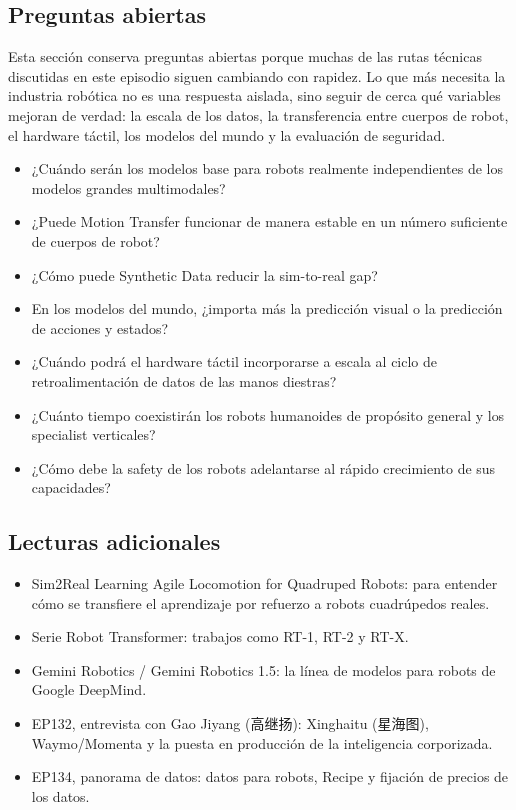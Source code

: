 \documentclass[a4paper]{article}
\begin{document}
\subsection{Preguntas abiertas}

Esta sección conserva preguntas abiertas porque muchas de las rutas técnicas discutidas en este episodio siguen cambiando con rapidez. Lo que más necesita la industria robótica no es una respuesta aislada, sino seguir de cerca qué variables mejoran de verdad: la escala de los datos, la transferencia entre cuerpos de robot, el hardware táctil, los modelos del mundo y la evaluación de seguridad.

\begin{itemize}
\item ¿Cuándo serán los modelos base para robots realmente independientes de los modelos grandes multimodales?
\item ¿Puede Motion Transfer funcionar de manera estable en un número suficiente de cuerpos de robot?
\item ¿Cómo puede Synthetic Data reducir la sim-to-real gap?
\item En los modelos del mundo, ¿importa más la predicción visual o la predicción de acciones y estados?
\item ¿Cuándo podrá el hardware táctil incorporarse a escala al ciclo de retroalimentación de datos de las manos diestras?
\item ¿Cuánto tiempo coexistirán los robots humanoides de propósito general y los specialist verticales?
\item ¿Cómo debe la safety de los robots adelantarse al rápido crecimiento de sus capacidades?
\end{itemize}

\subsection{Lecturas adicionales}

\begin{itemize}
\item Sim2Real Learning Agile Locomotion for Quadruped Robots: para entender cómo se transfiere el aprendizaje por refuerzo a robots cuadrúpedos reales.
\item Serie Robot Transformer: trabajos como RT-1, RT-2 y RT-X.
\item Gemini Robotics / Gemini Robotics 1.5: la línea de modelos para robots de Google DeepMind.
\item EP132, entrevista con Gao Jiyang (高继扬): Xinghaitu (星海图), Waymo/Momenta y la puesta en producción de la inteligencia corporizada.
\item EP134, panorama de datos: datos para robots, Recipe y fijación de precios de los datos.
\end{itemize}
\end{document}
